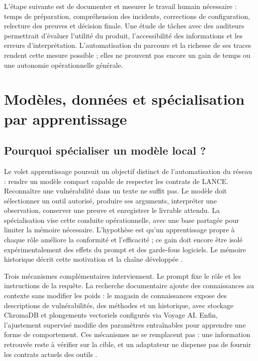 \documentclass[11pt,a4paper]{article}
\begin{document}
L'étape suivante est de documenter et mesurer le travail humain nécessaire :
temps de préparation, compréhension des incidents, corrections de configuration,
relecture des preuves et décision finale. Une étude de tâches avec des
auditeurs permettrait d'évaluer l'utilité du produit, l'accessibilité des
informations et les erreurs d'interprétation. L'automatisation du parcours et
la richesse de ses traces rendent cette mesure possible ; elles ne prouvent
pas encore un gain de temps ou une autonomie opérationnelle générale.


\section{Modèles, données et spécialisation par apprentissage}
\label{sec:modeles}

\subsection{Pourquoi spécialiser un modèle local ?}

Le volet apprentissage poursuit un objectif distinct de l'automatisation du
réseau : rendre un modèle compact capable de respecter les contrats de LANCE.
Reconnaître une vulnérabilité dans un texte ne suffit pas. Le modèle doit
sélectionner un outil autorisé, produire ses arguments, interpréter une
observation, conserver une preuve et enregistrer le livrable attendu. La
spécialisation vise cette conduite opérationnelle, avec une base partagée pour
limiter la mémoire nécessaire. L'hypothèse est qu'un apprentissage propre à
chaque rôle améliore la conformité et l'efficacité ; ce gain doit encore être
isolé expérimentalement des effets du prompt et des garde-fous logiciels.
Le mémoire historique décrit cette motivation et la chaîne développée
\cite{ml-memoire}.

Trois mécanismes complémentaires interviennent. Le prompt fixe le rôle et les
instructions de la requête. La recherche documentaire ajoute des connaissances
au contexte sans modifier les poids : le magasin de connaissances expose des
descriptions de vulnérabilités, des méthodes et un historique, avec stockage
ChromaDB et plongements vectoriels configurés via Voyage AI. Enfin,
l'ajustement supervisé modifie des paramètres entraînables pour apprendre une
forme de comportement. Ces mécanismes ne se remplacent pas : une information
retrouvée reste à vérifier sur la cible, et un adaptateur ne dispense pas de
fournir les contrats actuels des outils \cite{arch-memoire,arch-connaissances}.
\end{document}
